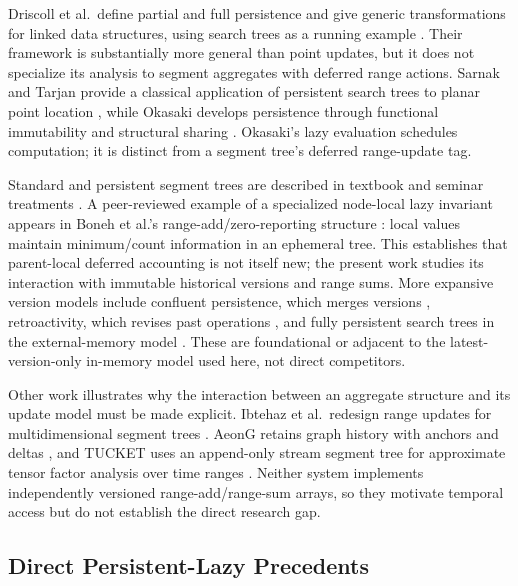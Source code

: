 \documentclass[conference]{IEEEtran}
\begin{document}
Driscoll et al.\ define partial and full persistence and give generic transformations for linked
data structures, using search trees as a running example \cite{driscoll1989persistent}. Their
framework is substantially more general than point updates, but it does not specialize its
analysis to segment aggregates with deferred range actions. Sarnak and Tarjan provide a classical
application of persistent search trees to planar point location \cite{sarnak1986planar}, while
Okasaki develops persistence through functional immutability and structural sharing
\cite{okasaki1998purely}. Okasaki's lazy evaluation schedules computation; it is distinct from a
segment tree's deferred range-update tag.

Standard and persistent segment trees are described in textbook and seminar treatments
\cite{laaksonen2020guide,massri_segment_trees}. A peer-reviewed example of a specialized
node-local lazy invariant appears in Boneh et al.'s range-add/zero-reporting structure
\cite[Lemma~35]{boneh2024string}: local values maintain minimum/count information in an ephemeral
tree. This establishes that parent-local deferred accounting is not itself new; the present work
studies its interaction with immutable historical versions and range sums. More expansive version models
include confluent persistence, which merges versions \cite{fiat2003confluent}, retroactivity,
which revises past operations \cite{demaine2007retroactive}, and fully persistent search trees in
the external-memory model \cite{brodal2023external}. These are foundational or adjacent to the
latest-version-only in-memory model used here, not direct competitors.

Other work illustrates why the interaction between an aggregate structure and its update model
must be made explicit. Ibtehaz et al.\ redesign range updates for multidimensional segment trees
\cite{ibtehaz2021multidimensional}. AeonG retains graph history with anchors and deltas
\cite{hou2024aeong}, and TUCKET uses an append-only stream segment tree for approximate tensor
factor analysis over time ranges \cite{qiu2024tucket}. Neither system implements independently
versioned range-add/range-sum arrays, so they motivate temporal access but do not establish the
direct research gap.

\subsection{Direct Persistent-Lazy Precedents}
\label{sec:direct}
\end{document}
